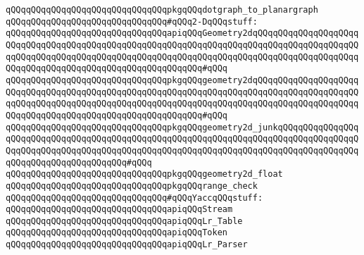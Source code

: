 \verb|qQQqqQQqqQQqqQQqqQQqqQQqqQQqqQQqpkgqQQqdotgraph_to_planargraph|\newline
\newline
\newline
\newline
\newline
\verb|qQQqqQQqqQQqqQQqqQQqqQQqqQQqqQQq#qQQq2-DqQQqstuff:|\newline
\newline
\verb|qQQqqQQqqQQqqQQqqQQqqQQqqQQqqQQqapiqQQqGeometry2dqQQqqQQqqQQqqQQqqQQqqQQqqQQqqQQqqQQqqQQqqQQqqQQqqQQqqQQqqQQqqQQqqQQqqQQqqQQqqQQqqQQqqQQqqQQqqQQqqQQqqQQqqQQqqQQqqQQqqQQqqQQqqQQqqQQqqQQqqQQqqQQqqQQqqQQqqQQqqQQqqQQqqQQqqQQqqQQqqQQqqQQqqQQqqQQqqQQqqQQq#qQQq|\newline
\verb|qQQqqQQqqQQqqQQqqQQqqQQqqQQqqQQqpkgqQQqgeometry2dqQQqqQQqqQQqqQQqqQQqqQQqqQQqqQQqqQQqqQQqqQQqqQQqqQQqqQQqqQQqqQQqqQQqqQQqqQQqqQQqqQQqqQQqqQQqqQQqqQQqqQQqqQQqqQQqqQQqqQQqqQQqqQQqqQQqqQQqqQQqqQQqqQQqqQQqqQQqqQQqqQQqqQQqqQQqqQQqqQQqqQQqqQQqqQQqqQQqqQQq#qQQq|\newline
\newline
\verb|qQQqqQQqqQQqqQQqqQQqqQQqqQQqqQQqpkgqQQqgeometry2d_junkqQQqqQQqqQQqqQQqqQQqqQQqqQQqqQQqqQQqqQQqqQQqqQQqqQQqqQQqqQQqqQQqqQQqqQQqqQQqqQQqqQQqqQQqqQQqqQQqqQQqqQQqqQQqqQQqqQQqqQQqqQQqqQQqqQQqqQQqqQQqqQQqqQQqqQQqqQQqqQQqqQQqqQQqqQQqqQQqqQQq#qQQq|\newline
\newline
\verb|qQQqqQQqqQQqqQQqqQQqqQQqqQQqqQQqpkgqQQqgeometry2d_float|\newline
\newline
\verb|qQQqqQQqqQQqqQQqqQQqqQQqqQQqqQQqpkgqQQqrange_check|\newline
\newline
\newline
\newline
\verb|qQQqqQQqqQQqqQQqqQQqqQQqqQQqqQQq#qQQqYaccqQQqstuff:|\newline
\newline
\verb|qQQqqQQqqQQqqQQqqQQqqQQqqQQqqQQqapiqQQqStream|\newline
\verb|qQQqqQQqqQQqqQQqqQQqqQQqqQQqqQQqapiqQQqLr_Table|\newline
\verb|qQQqqQQqqQQqqQQqqQQqqQQqqQQqqQQqapiqQQqToken|\newline
\verb|qQQqqQQqqQQqqQQqqQQqqQQqqQQqqQQqapiqQQqLr_Parser|\newline
